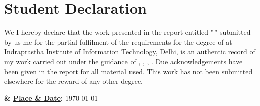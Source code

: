 
\chapter*{\centering \huge Student Declaration}

\begin{minipage}{\textwidth}
    \begin{flushleft}  
        \ifdefined\twoAuthor We \else I \fi
        hereby declare that the work presented in the report entitled \textbf{"\projTitle"} submitted by 
        \ifdefined\twoAuthor us \else me \fi
        for the partial fulfilment of the requirements for the degree of \textit{\prog} at
        Indraprastha Institute of Information Technology, Delhi, is an authentic record of my work carried out under the guidance of 
        \textbf{\advisorone} \ifx\advisortwo\empty\else, \textbf{\advisortwo}\fi \ifx\advisorthree\empty\else, \textbf{\advisorthree}\fi \ifx\advisorfour\empty\else, \textbf{\advisorfour}\fi. 
        Due acknowledgements have been given in the report for all material used. 
        This work has not been submitted elsewhere for the reward of any other degree.


        \vspace{0.5in}

        \textbf{
            \projAuthorOneName
            \ifdefined\twoAuthor
                { \& \projAuthorTwoName}
            \fi
            } \hfill
        {\textbf{\underline{Place \& Date}:} \today} \\ 

    \end{flushleft}
\end{minipage}

\vfill

